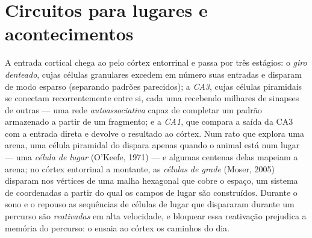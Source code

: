 \section{Circuitos para lugares e acontecimentos}

\begin{definition}\label{def:b3:learning-memory:hippocampus}
A entrada cortical chega ao  pelo córtex entorrinal e passa por
três estágios: o \emph{giro denteado}, cujas células granulares
excedem em número suas entradas e disparam de modo esparso (separando
padrões parecidos); a \emph{CA3}, cujas células piramidais se conectam
recorrentemente entre si, cada uma recebendo milhares de sinapses de
outras --- uma rede \emph{autoassociativa} capaz de completar um padrão
armazenado a partir de um fragmento; e a \emph{CA1}, que compara a saída
da CA3 com a entrada direta e devolve o resultado ao córtex. Num rato
que explora uma arena, uma célula piramidal do  dispara apenas
quando o animal está num lugar --- uma \emph{célula de lugar} (O'Keefe,
1971) --- e algumas centenas delas mapeiam a arena; no córtex entorrinal
a montante, as \emph{células de grade} (Moser, 2005) disparam nos
vértices de uma malha hexagonal que cobre o espaço, um sistema de
coordenadas a partir do qual os campos de lugar são construídos. Durante
o sono e o repouso as sequências de células de lugar que dispararam
durante um percurso são \emph{reativadas} em alta velocidade, e bloquear
essa reativação prejudica a memória do percurso: o  ensaia ao
córtex os caminhos do dia.
\end{definition}

